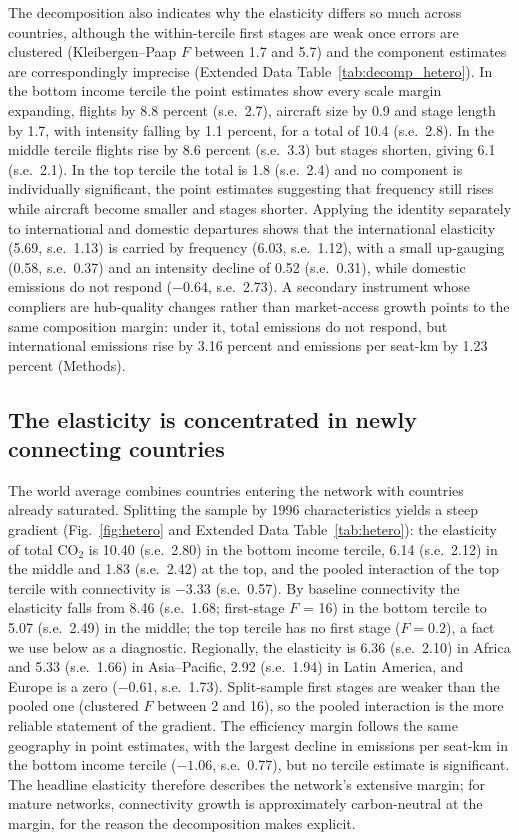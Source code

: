 \documentclass[12pt]{article}
\begin{document}
The decomposition also indicates why the elasticity differs so much
across countries, although the within-tercile first stages are weak once
errors are clustered (Kleibergen--Paap $F$ between 1.7 and 5.7) and the
component estimates are correspondingly imprecise (Extended Data
Table~\ref{tab:decomp_hetero}). In the bottom income tercile the point
estimates show every scale margin expanding, flights by 8.8 percent (s.e.\
2.7), aircraft size by 0.9 and stage length by 1.7, with intensity falling
by 1.1 percent, for a total of 10.4 (s.e.\ 2.8). In the middle tercile
flights rise by 8.6 percent (s.e.\ 3.3) but stages shorten, giving 6.1
(s.e.\ 2.1). In the top tercile the total is 1.8 (s.e.\ 2.4) and no
component is individually significant, the point estimates suggesting
that frequency still rises while aircraft become smaller and stages
shorter. Applying the identity separately to international and domestic
departures shows that the international elasticity (5.69, s.e.\ 1.13) is
carried by frequency (6.03, s.e.\ 1.12), with a small up-gauging (0.58,
s.e.\ 0.37) and an intensity decline of 0.52 (s.e.\ 0.31), while domestic
emissions do not respond ($-0.64$, s.e.\ 2.73). A secondary instrument whose compliers are
hub-quality changes rather than market-access growth points to the same
composition margin: under it, total emissions do not respond, but
international emissions rise by 3.16 percent and emissions per seat-km by
1.23 percent (Methods).

\subsection*{The elasticity is concentrated in newly connecting countries}
The world average combines countries entering the network with countries
already saturated. Splitting the sample by 1996 characteristics yields a
steep gradient (Fig.~\ref{fig:hetero} and Extended Data
Table~\ref{tab:hetero}): the elasticity of total CO$_2$ is 10.40 (s.e.\
2.80) in the bottom income tercile, 6.14 (s.e.\ 2.12) in the middle and
1.83 (s.e.\ 2.42) at the top, and the pooled interaction of the top
tercile with connectivity is $-3.33$ (s.e.\ 0.57). By baseline
connectivity the elasticity falls from 8.46 (s.e.\ 1.68; first-stage $F$ =
16) in the bottom tercile to 5.07 (s.e.\ 2.49) in the middle; the top
tercile has no first stage ($F = 0.2$), a fact we use below as a
diagnostic. Regionally, the elasticity is 6.36 (s.e.\ 2.10) in Africa and
5.33 (s.e.\ 1.66) in Asia--Pacific, 2.92 (s.e.\ 1.94) in Latin America,
and Europe is a zero ($-0.61$, s.e.\ 1.73). Split-sample first stages are
weaker than the pooled one (clustered $F$ between 2 and 16), so the pooled
interaction is the more reliable statement of the gradient. The efficiency
margin follows the same geography in point estimates, with the largest
decline in emissions per seat-km in the bottom income tercile ($-1.06$,
s.e.\ 0.77), but no tercile estimate is significant. The headline elasticity therefore describes
the network's extensive margin; for mature networks, connectivity growth is
approximately carbon-neutral at the margin, for the reason the
decomposition makes explicit.
\end{document}
